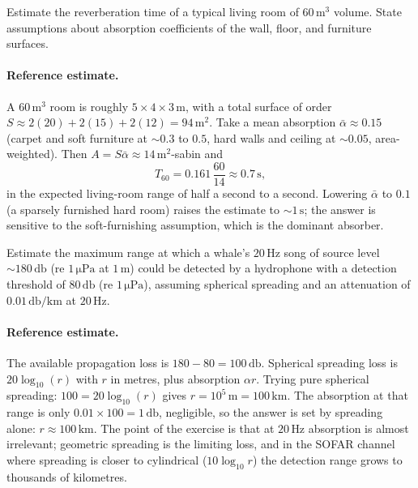 \begin{exercise}
Estimate the reverberation time of a typical living room of
$60\,\si{\meter\cubed}$ volume. State assumptions about absorption
coefficients of the wall, floor, and furniture surfaces.
\paragraph{Reference estimate.} A $60\,\si{\meter\cubed}$ room is
roughly $5\times4\times3\,\si{\meter}$, with a total surface of order
$S\approx 2(20) + 2(15) + 2(12) = 94\,\si{\meter\squared}$. Take a
mean absorption $\bar\alpha\approx 0.15$ (carpet and soft furniture at
$\sim 0.3$ to $0.5$, hard walls and ceiling at $\sim 0.05$, area-
weighted). Then $A = S\bar\alpha \approx 14\,\si{\meter\squared}$-sabin
and
\[
T_{60} = 0.161\,\frac{60}{14} \approx 0.7\,\si{\second},
\]
in the expected living-room range of half a second to a second.
Lowering $\bar\alpha$ to $0.1$ (a sparsely furnished hard room) raises
the estimate to $\sim 1\,\si{\second}$; the answer is sensitive to the
soft-furnishing assumption, which is the dominant absorber.
\end{exercise}

\begin{exercise}
Estimate the maximum range at which a whale's $20\,\si{\hertz}$ song
of source level $\sim 180\,\si{\decibel}$ (re $1\,\si{\micro\pascal}$
at $1\,\si{\meter}$) could be detected by a hydrophone with a
detection threshold of $80\,\si{\decibel}$ (re $1\,\si{\micro\pascal}$),
assuming spherical spreading and an attenuation of $0.01\,\si{
\decibel\per\kilo\meter}$ at $20\,\si{\hertz}$.
\paragraph{Reference estimate.} The available propagation loss is
$180 - 80 = 100\,\si{\decibel}$. Spherical spreading loss is
$20\log_{10}(r)$ with $r$ in metres, plus absorption $\alpha r$.
Trying pure spherical spreading: $100 = 20\log_{10}(r)$ gives
$r = 10^{5}\,\si{\meter} = 100\,\si{\kilo\meter}$. The absorption at
that range is only $0.01\times 100 = 1\,\si{\decibel}$, negligible, so
the answer is set by spreading alone: $r\approx 100\,\si{\kilo\meter}$.
The point of the exercise is that at $20\,\si{\hertz}$ absorption is
almost irrelevant; geometric spreading is the limiting loss, and in
the SOFAR channel where spreading is closer to cylindrical
($10\log_{10}r$) the detection range grows to thousands of kilometres.
\end{exercise}

